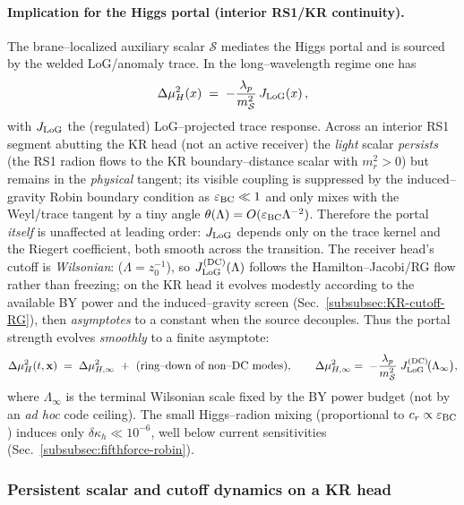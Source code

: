 \documentclass[10pt]{article}
\theoremstyle{definition}
\theoremstyle{plain}
\begin{document}
\paragraph{Implication for the Higgs portal (interior RS1/KR continuity).}\label{par:uom-main-123}
The brane–localized auxiliary scalar $\mathcal S$ mediates the Higgs portal and is sourced by the welded LoG/anomaly trace. In the long–wavelength regime one has
\[
\Delta\mu_H^2(x)\;=\;-\frac{\lambda_p}{m_{\mathcal S}^2}\,J_{\rm LoG}(x)\,,
\]
with $J_{\rm LoG}$ the (regulated) LoG–projected trace response. Across an interior RS1 segment abutting the KR head
(not an active receiver) the \emph{light} scalar \emph{persists}
(the RS1 radion flows to the KR boundary--distance scalar with $m_r^2>0$) but remains in the \emph{physical} tangent; its visible coupling is suppressed by the induced--gravity Robin boundary condition as $\varepsilon_{\rm BC}\ll 1$ and only mixes with the Weyl/trace tangent by a tiny angle
$\theta(\Lambda)=O(\varepsilon_{\rm BC}\Lambda^{-2})$. Therefore the portal \emph{itself} is unaffected at leading order: $J_{\rm LoG}$ depends only on the trace kernel and the Riegert coefficient, both smooth across the transition. The receiver head's cutoff is \emph{Wilsonian}: ($\Lambda=z_0^{-1}$), so $J_{\rm LoG}^{\rm (DC)}(\Lambda)$ follows the Hamilton--Jacobi/RG flow rather than freezing; on the KR head it evolves modestly according to the available BY power and the induced--gravity screen (Sec.~\ref{subsubsec:KR-cutoff-RG}), then \emph{asymptotes} to a constant when the source decouples. Thus the portal strength evolves \emph{smoothly} to a finite asymptote:
\begin{equation}
\label{eq:dmuh-DC}
\Delta\mu_H^2(t,\mathbf x)\;=\;\Delta\mu_{H,\infty}^2\ +\ \text{(ring–down of non–DC modes)},
\qquad
\Delta\mu_{H,\infty}^2=\;-\frac{\lambda_p}{m_{\mathcal S}^2}\;J_{\rm LoG}^{\rm (DC)}\!\big(\Lambda_\infty\big),
\end{equation}
where $\Lambda_\infty$ is the terminal Wilsonian scale fixed by the BY power budget (not by an \emph{ad hoc} code ceiling). The small Higgs–radion mixing (proportional to $c_r\propto \varepsilon_{\rm BC}$) induces only $\delta\kappa_h\ll 10^{-6}$, well below current sensitivities (Sec.~\ref{subsubsec:fifthforce-robin}).

\subsubsection*{Persistent scalar and cutoff dynamics on a KR head}
\label{subsubsec:KR-cutoff-RG}
\end{document}
